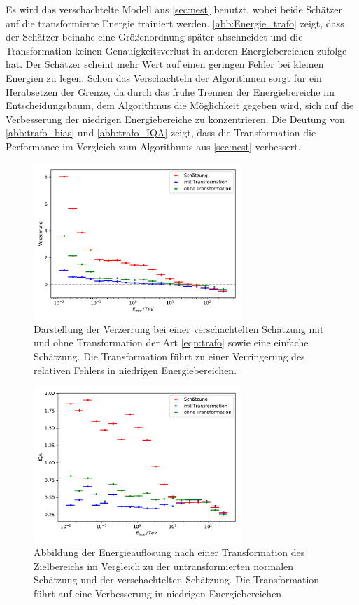 Es wird das verschachtelte Modell aus \autoref{sec:nest} benutzt, wobei beide Schätzer auf die transformierte Energie trainiert werden.
\autoref{abb:Energie_trafo} zeigt, dass der Schätzer beinahe eine Größenordnung später abschneidet und die Transformation keinen Genauigkeitsverlust
in anderen Energiebereichen zufolge hat.
Der Schätzer scheint mehr Wert auf einen geringen Fehler bei kleinen Energien zu legen.
Schon das Verschachteln der Algorithmen sorgt für ein Herabsetzen der Grenze, da durch das frühe Trennen der Energiebereiche im Entscheidungsbaum, dem
Algorithmus die Möglichkeit gegeben wird, sich auf die Verbesserung der niedrigen Energiebereiche zu konzentrieren.
Die Deutung von \autoref{abb:trafo_bias} und \autoref{abb:trafo_IQA} zeigt, dass die Transformation die Performance im Vergleich
zum Algorithmus aus \ref{sec:nest} verbessert.
\begin{figure}
  \includegraphics[width=0.7\textwidth]{Plots/trafo_nested_bias.pdf}
  \centering
  \caption{Darstellung der Verzerrung bei einer verschachtelten Schätzung mit und ohne Transformation der Art \eqref{eqn:trafo} sowie eine einfache Schätzung. Die Transformation führt zu einer Verringerung
          des relativen Fehlers in niedrigen Energiebereichen.}
  \label{abb:trafo_bias}
\end{figure}
\begin{figure}
  \includegraphics[width=0.7\textwidth]{Plots/trafo_nested_resolution.pdf}
  \centering
  \caption{Abbildung der Energieauflösung nach einer Transformation des Zielbereichs im Vergleich zu der untransformierten normalen Schätzung und der verschachtelten Schätzung. Die Transformation führt auf eine
          Verbesserung in niedrigen Energiebereichen.}
  \label{abb:trafo_IQA}
\end{figure}

